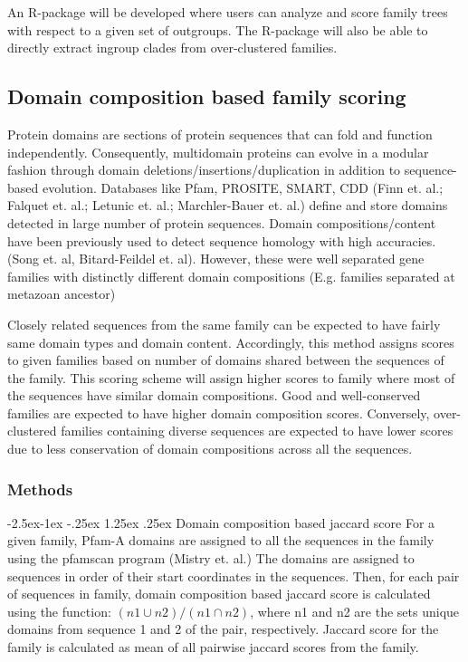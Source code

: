 \documentclass{article}
\makeatletter
\renewcommand\paragraph{\@startsection{paragraph}{4}{\z@}%
	{-2.5ex\@plus -1ex \@minus -.25ex}%
	{1.25ex \@plus .25ex}%
	{\normalfont\normalsize\bfseries}}
\makeatother
\begin{document}
		An R-package will be developed where users can analyze and score family trees with respect to a given set of outgroups. The R-package will also be able to directly extract ingroup clades from over-clustered families.
		\pagebreak
		
	\subsection{Domain composition based family scoring}
	Protein domains are sections of protein sequences that can fold and function independently. Consequently, multidomain proteins can evolve in a modular fashion through domain deletions/insertions/duplication in addition to sequence-based evolution. Databases like Pfam, PROSITE, SMART, CDD (Finn et. al.; Falquet et. al.; Letunic et. al.; Marchler-Bauer et. al.) define and store domains detected in large number of protein sequences. Domain compositions/content have been previously used to detect sequence homology with high accuracies. (Song et. al, Bitard-Feildel et. al). However, these were well separated gene families with distinctly different domain compositions (E.g. families separated at metazoan ancestor)
	
	Closely related sequences from the same family can be expected to have fairly same domain types and domain content. Accordingly, this method assigns scores to given families based on number of domains shared between the sequences of the family. This scoring scheme will assign higher scores to family where most of the sequences have similar domain compositions. Good and well-conserved families are expected to have higher domain composition scores. Conversely, over-clustered families containing diverse sequences are expected to have lower scores due to less conservation of domain compositions across all the sequences.
	
	\subsubsection{Methods}
		\paragraph{Domain composition based jaccard score}
		For a given family, Pfam-A domains are assigned to all the sequences in the family using the pfamscan program (Mistry et. al.) The domains are assigned  to sequences in order of their start coordinates in the sequences. Then, for each pair of sequences in family, domain composition based jaccard score is calculated using the function: $(n1 \cup  n2)/(n1 \cap n2)$, where n1 and n2 are the sets unique domains from sequence 1 and 2 of the pair, respectively. Jaccard score for the family is calculated as mean of all pairwise jaccard scores from the family.
		
\end{document}
